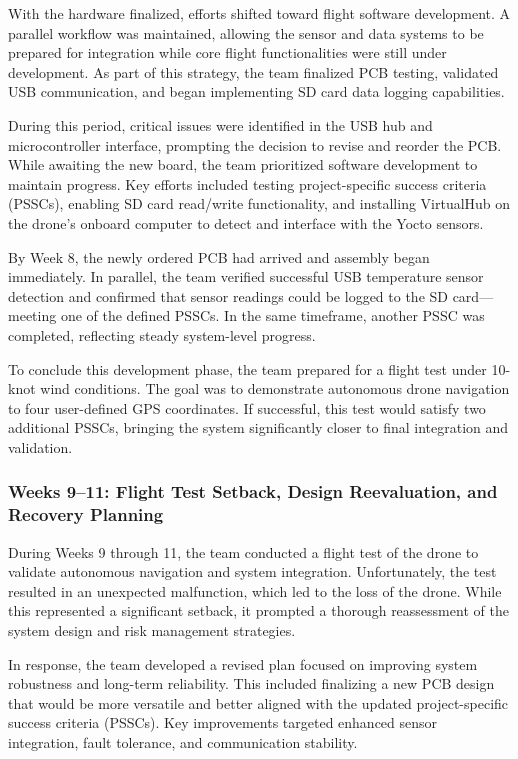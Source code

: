 \documentclass[12pt]{article}
\begin{document}
With the hardware finalized, efforts shifted toward flight software development. A parallel workflow was maintained, allowing the sensor and data systems to be prepared for integration while core flight functionalities were still under development. As part of this strategy, the team finalized PCB testing, validated USB communication, and began implementing SD card data logging capabilities.

During this period, critical issues were identified in the USB hub and microcontroller interface, prompting the decision to revise and reorder the PCB. While awaiting the new board, the team prioritized software development to maintain progress. Key efforts included testing project-specific success criteria (PSSCs), enabling SD card read/write functionality, and installing VirtualHub on the drone's onboard computer to detect and interface with the Yocto sensors.

By Week 8, the newly ordered PCB had arrived and assembly began immediately. In parallel, the team verified successful USB temperature sensor detection and confirmed that sensor readings could be logged to the SD card—meeting one of the defined PSSCs. In the same timeframe, another PSSC was completed, reflecting steady system-level progress.

To conclude this development phase, the team prepared for a flight test under 10-knot wind conditions. The goal was to demonstrate autonomous drone navigation to four user-defined GPS coordinates. If successful, this test would satisfy two additional PSSCs, bringing the system significantly closer to final integration and validation.

\subsubsection*{Weeks 9–11: Flight Test Setback, Design Reevaluation, and Recovery Planning}

During Weeks 9 through 11, the team conducted a flight test of the drone to validate autonomous navigation and system integration. Unfortunately, the test resulted in an unexpected malfunction, which led to the loss of the drone. While this represented a significant setback, it prompted a thorough reassessment of the system design and risk management strategies.

In response, the team developed a revised plan focused on improving system robustness and long-term reliability. This included finalizing a new PCB design that would be more versatile and better aligned with the updated project-specific success criteria (PSSCs). Key improvements targeted enhanced sensor integration, fault tolerance, and communication stability.
\end{document}
